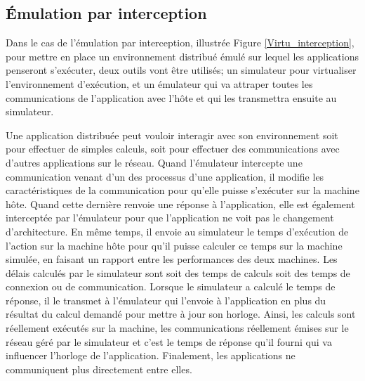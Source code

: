 \subsection{Émulation par interception}
\label{section:interception}

Dans le cas de l'émulation par interception, illustrée
Figure \ref{Virtu_interception}, pour mettre en place un environnement distribué
émulé sur lequel les applications penseront s'exécuter, deux outils vont être
utilisés; un simulateur pour virtualiser l'environnement d'exécution, et un
émulateur qui va attraper toutes les communications de l'application avec l'hôte
et qui les transmettra ensuite au simulateur.

 Une application distribuée peut vouloir interagir avec son environnement soit
 pour effectuer de simples calculs, soit pour effectuer des communications avec
 d'autres applications sur le réseau. Quand l'émulateur intercepte une
 communication venant d'un des processus d'une application, il modifie les
 caractéristiques de la communication pour qu'elle puisse s'exécuter sur la
 machine hôte. Quand cette dernière renvoie une réponse à l'application, elle
 est également interceptée par l'émulateur pour que l'application ne voit pas le
 changement d'architecture. En même temps, il envoie au simulateur le temps
 d'exécution de l'action sur la machine hôte pour qu'il puisse calculer ce temps
 sur la machine simulée, en faisant un rapport entre les performances des deux
 machines. Les délais calculés par le simulateur sont soit des temps de calculs
 soit des temps de connexion ou de communication. Lorsque le simulateur a
 calculé le temps de réponse, il le transmet à l'émulateur qui l'envoie à
 l'application en plus du résultat du calcul demandé pour mettre à jour son
 horloge. Ainsi, les calculs sont réellement exécutés sur la machine, les
 communications réellement émises sur le réseau géré par le simulateur et c'est
 le temps de réponse qu'il fourni qui va influencer l'horloge de
 l'application. Finalement, les applications ne communiquent plus directement
 entre elles.

